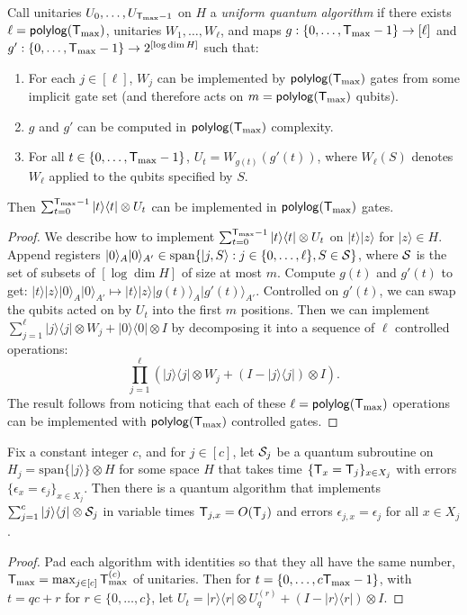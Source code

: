 \documentclass{article}
\def\ket#1{{\lvert}#1\rangle}
\def\bra#1{{\langle}#1\rvert}
\renewcommand{\>}{\rangle}
\newcommand{\<}{\langle}
\renewcommand{\(}{\left(}
\renewcommand{\)}{\right)}
\begin{document}
\begin{lemma}\label{lem:uniform-alg}
Call unitaries $U_0,\dots,U_{{\sf T}_{\max}-1}$ on $H$ a \emph{uniform quantum algorithm} if
there exists $\ell={\sf polylog}({\sf T}_{\max})$, unitaries $W_1,\dots,W_{\ell}$, and maps $g:\{0,\dots,{\sf T}_{\max}-1\}\rightarrow[\ell]$ and $g':\{0,\dots,{\sf T}_{\max}-1\}\rightarrow 2^{[\log\dim H]}$ such that:
\begin{enumerate}
\item For each $j\in [\ell]$, $W_j$ can be implemented by ${\sf polylog}({\sf T}_{\max})$ gates from some implicit gate set (and therefore acts on $m={\sf polylog}({\sf T}_{\max})$ qubits).
\item $g$ and $g'$ can be computed in ${\sf polylog}({\sf T}_{\max})$ complexity.
\item For all $t\in\{0,\dots,{\sf T}_{\max}-1\}$, $U_t = W_{g(t)}(g'(t))$, where $W_{\ell}(S)$ denotes $W_{\ell}$ applied to the qubits specified by $S$.
\end{enumerate}
Then $\sum_{t=0}^{{\sf T}_{\max}-1}\ket{t}\bra{t}\otimes U_t$ can be implemented in ${\sf polylog}({\sf T}_{\max})$ gates. 
\end{lemma}
\begin{proof}
We describe how to implement $\sum_{t=0}^{{\sf T}_{\max}-1}\ket{t}\bra{t}\otimes U_t$ on $\ket{t}\ket{z}$ for $\ket{z}\in H$. 
Append registers $\ket{0}_A\ket{0}_{A'}\in\mathrm{span}\{\ket{j,S}:j\in \{0,\dots,\ell\}, S\in {\cal S}\}$, where ${\cal S}$ is the set of subsets of $[\log\dim H]$ of size at most $m$. 
Compute $g(t)$ and $g'(t)$ to get:
$\ket{t}\ket{z}\ket{0}_A\ket{0}_{A'}\mapsto \ket{t}\ket{z}\ket{g(t)}_A\ket{g'(t)}_{A'}.$
Controlled on $g'(t)$, we can swap the qubits acted on by $U_t$ into the first $m$ positions. Then we can implement $\sum_{j=1}^{\ell}\ket{j}\bra{j}\otimes W_j+\ket{0}\bra{0}\otimes I$ by decomposing it into a sequence of $\ell$ controlled operations:
$$\textstyle{\displaystyle\prod}_{j=1}^{\ell}\left(\ket{j}\bra{j}\otimes W_j+(I-\ket{j}\bra{j})\otimes I\right).$$
The result follows from noticing that each of these $\ell={\sf polylog}({\sf T}_{\max})$ operations can be implemented with ${\sf polylog}({\sf T}_{\max})$ controlled gates.
\end{proof}

\begin{lemma}\label{lem:uniform-combine}
Fix a constant integer $c$, and for $j\in [c]$, let ${\cal S}_j$ be a quantum subroutine on $H_j=\mathrm{span}\{\ket{j}\}\otimes H$ for some space $H$ that takes time $\{{\sf T}_x={\sf T}_j\}_{x\in X_j}$ with errors $\{\epsilon_x=\epsilon_j\}_{x\in X_j}$. Then there is a quantum algorithm that implements $\sum_{j=1}^c\ket{j}\bra{j}\otimes {\cal S}_j$ in variable times ${\sf T}_{j,x}=O({\sf T}_j)$ and errors $\epsilon_{j,x}=\epsilon_j$ for all $x\in X_j$.
\end{lemma}
\begin{proof}
Pad each algorithm with identities so that they all have the same number, ${\sf T}_{\max}=\max_{j\in [c]}{\sf T}_{\max}^{(c)}$ of unitaries. Then for $t=\{0,\dots,c{\sf T}_{\max}-1\}$, with $t=qc+r$ for $r\in\{0,\dots,c\}$, let $U_t= \ket{r}\bra{r}\otimes U_q^{(r)}+(I-\ket{r}\bra{r})\otimes I$. 
\end{proof}
\end{document}
